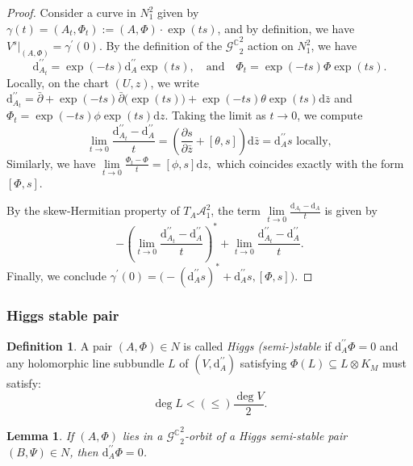 \documentclass[a4paper]{amsart}
\newtheorem{lemma}[theorem]{Lemma}
\theoremstyle{definition}
\newtheorem{definition}[theorem]{Definition}
\theoremstyle{remark}
\numberwithin{equation}{section}
\begin{document}
\begin{proof}
Consider a curve in $N_1^2$ given by $\gamma(t) = (A_t, \Phi_t) := (A, \Phi) \cdot \exp(ts)$, and by definition, we have $V^s\big|_{(A,\Phi)} = \gamma^\prime(0)$. By the definition of the ${\mathcal{G}^\mathbb{C}}_2^2$ action on $N_1^2$, we have 
\[
\mathrm{d}_{A_t}^{\prime\prime} = \exp(-ts) \mathrm{d}_{A}^{\prime\prime} \exp(ts), \quad \text{and} \quad \Phi_t = \exp(-ts) \Phi \exp(ts).
\]
Locally, on the chart $(U, z)$, we write $\mathrm{d}_{A_t}^{\prime\prime} = \bar{\partial} + \exp(-ts) \bar{\partial} \big(\exp(ts)\big) + \exp(-ts) \theta \exp(ts) \mathrm{d}\bar{z}$ and $\Phi_t = \exp(-ts) \phi \exp(ts) \mathrm{d}z$. Taking the limit as $t \to 0$, we compute
\[
\lim_{t \to 0} \frac{\mathrm{d}_{A_t}^{\prime\prime} - \mathrm{d}_A^{\prime\prime}}{t} = \left(\frac{\partial s}{\partial \bar{z}} + [\theta, s]\right) \mathrm{d}\bar{z}=\mathrm{d}_A^{\prime\prime}s\text{ locally},
\]
Similarly, we have $\lim\limits_{t \to 0} \frac{\Phi_t - \Phi}{t} = [\phi, s] \mathrm{d}z,$ which coincides exactly with the form $[\Phi, s]$.

By the skew-Hermitian property of $T_A \mathscr{A}_1^2$, the term  $\lim\limits_{t \to 0} \frac{\mathrm{d}_{A_t} - \mathrm{d}_A}{t}$ is given by 
\[
-\left(\lim\limits_{t \to 0} \frac{ \mathrm{d}_{A_t}^{\prime\prime} - \mathrm{d}_A^{\prime\prime}}{t}\right)^*+\lim\limits_{t \to 0} \frac{\mathrm{d}_{A_t}^{\prime\prime} - \mathrm{d}_A^{\prime\prime}}{t} .
\] 
Finally, we conclude $\gamma^\prime(0) = \Big(- (\mathrm{d}_A^{\prime\prime}s)^* + \mathrm{d}_A^{\prime\prime}s, [\Phi, s]\Big).$
\end{proof}



\subsubsection{Higgs stable pair}
\begin{definition}
A pair $(A, \Phi) \in N$ is called \textit{Higgs (semi-)stable} if $\mathrm{d}_A^{\prime\prime} \Phi = 0$ and any holomorphic line subbundle $L$ of $(V, \mathrm{d}_A^{\prime\prime})$ satisfying $\Phi(L) \subseteq L \otimes K_M$ must satisfy:
\[
\deg L < \left(\leq\right) \frac{\deg V}{2}.
\]
\end{definition}

\begin{lemma}
If $(A, \Phi)$ lies in a ${\mathscr{G}^\mathbb{C}}_2^2$-orbit of a Higgs semi-stable pair $(B, \Psi) \in N$, then $\mathrm{d}_A^{\prime\prime} \Phi = 0$.
\end{lemma}
\end{document}
